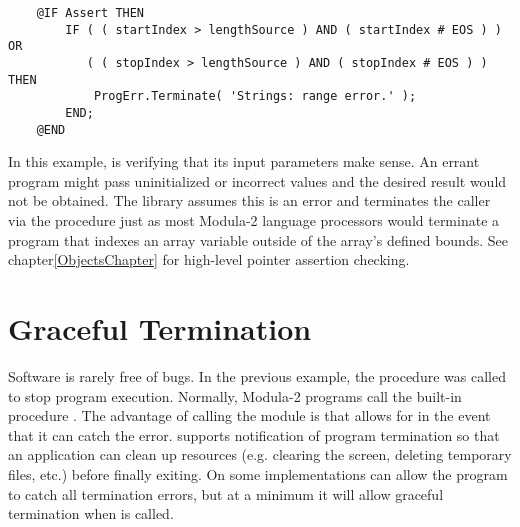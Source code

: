 \begin{verbatim}
    @IF Assert THEN
        IF ( ( startIndex > lengthSource ) AND ( startIndex # EOS ) ) OR
           ( ( stopIndex > lengthSource ) AND ( stopIndex # EOS ) ) THEN
            ProgErr.Terminate( 'Strings: range error.' );
        END;
    @END
\end{verbatim}

In this example,  is verifying that
its input parameters make sense.  An errant program might pass
uninitialized or incorrect values and the desired result
would not be obtained.  The library assumes this is an error
and terminates the caller via the procedure 
just as most Modula-2 language processors would terminate a program
that indexes an array variable outside of the array's defined bounds.
See chapter\ref{ObjectsChapter} for high-level pointer assertion
checking.


\section{Graceful Termination}


Software is rarely free of bugs.  In the previous example, the
procedure  was called to stop
program execution.  Normally, Modula-2 programs call the
built-in procedure .  The advantage of calling the
module  is that  allows for
 in the event that it can catch the
error.   supports notification of program
termination so that an application can clean up resources
(e.g. clearing the screen, deleting temporary files, etc.)
before finally exiting.  On some implementations 
can allow the program to catch all termination errors, but
at a minimum it will allow graceful termination when 
 is called.

